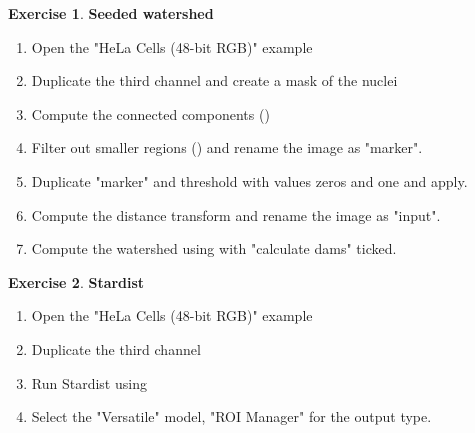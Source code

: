 \documentclass[xcolor=table,DIV=19,twocolumn,10pt]{scrartcl}
\theoremstyle{definition}
\newtheorem{exercice}{Exercise}
\begin{document}
\begin{exercice} \textbf{Seeded watershed}
  \begin{enumerate}
    \item Open the "HeLa Cells (48-bit RGB)" example
    \item Duplicate the third channel and create a mask of the nuclei
    \item Compute the connected components ()
    \item Filter out smaller regions () and rename the image as "marker".
    \item Duplicate "marker" and threshold with values zeros and one and apply.
    \item Compute the distance transform  and rename the image as "input".
    \item Compute the watershed using  with "calculate dams" ticked.
  \end{enumerate}
\end{exercice}

\begin{exercice} \textbf{Stardist}
  \begin{enumerate}
    \item Open the "HeLa Cells (48-bit RGB)" example
    \item Duplicate the third channel 
    \item Run Stardist using 
    \item Select the "Versatile" model, "ROI Manager" for the output type. 
  \end{enumerate}
\end{exercice} 
\end{document}
